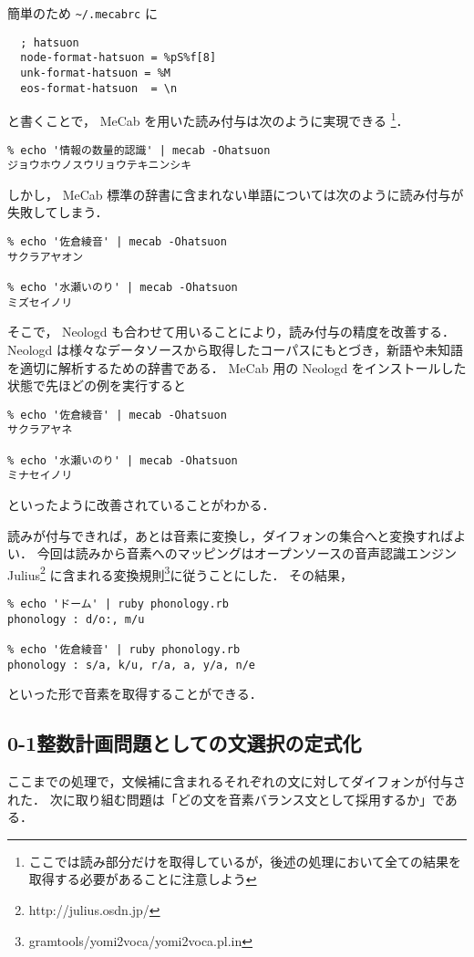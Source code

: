 \documentclass[final,10pt,twocolumn,3p,times,fleqn]{elsarticle}
\begin{document}
  簡単のため \verb|~/.mecabrc| に

  \begin{verbatim}
  ; hatsuon
  node-format-hatsuon = %pS%f[8]
  unk-format-hatsuon = %M
  eos-format-hatsuon  = \n	
  \end{verbatim}

  と書くことで， MeCab を用いた読み付与は次のように実現できる
  \footnote{ここでは読み部分だけを取得しているが，後述の処理において全ての結果を取得する必要があることに注意しよう}．

  \begin{verbatim}
% echo '情報の数量的認識' | mecab -Ohatsuon
ジョウホウノスウリョウテキニンシキ
  \end{verbatim}

 しかし， MeCab 標準の辞書に含まれない単語については次のように読み付与が失敗してしまう．
  \begin{verbatim}
% echo '佐倉綾音' | mecab -Ohatsuon
サクラアヤオン

% echo '水瀬いのり' | mecab -Ohatsuon
ミズセイノリ
  \end{verbatim}

  そこで， Neologd\cite{neologd} も合わせて用いることにより，読み付与の精度を改善する．
  Neologd は様々なデータソースから取得したコーパスにもとづき，新語や未知語を適切に解析するための辞書である．
  MeCab 用の Neologd をインストールした状態で先ほどの例を実行すると

  \begin{verbatim}
% echo '佐倉綾音' | mecab -Ohatsuon
サクラアヤネ

% echo '水瀬いのり' | mecab -Ohatsuon
ミナセイノリ
  \end{verbatim}
  
  といったように改善されていることがわかる．

  読みが付与できれば，あとは音素に変換し，ダイフォンの集合へと変換すればよい．
  今回は読みから音素へのマッピングはオープンソースの音声認識エンジン Julius\footnote{http://julius.osdn.jp/}
  に含まれる変換規則\footnote{gramtools/yomi2voca/yomi2voca.pl.in}に従うことにした．
  その結果，

  \begin{verbatim}
% echo 'ドーム' | ruby phonology.rb
phonology : d/o:, m/u

% echo '佐倉綾音' | ruby phonology.rb
phonology : s/a, k/u, r/a, a, y/a, n/e
  \end{verbatim}

  といった形で音素を取得することができる．
  \subsection{0-1整数計画問題としての文選択の定式化}
  ここまでの処理で，文候補に含まれるそれぞれの文に対してダイフォンが付与された．
  次に取り組む問題は「どの文を音素バランス文として採用するか」である．
\end{document}
